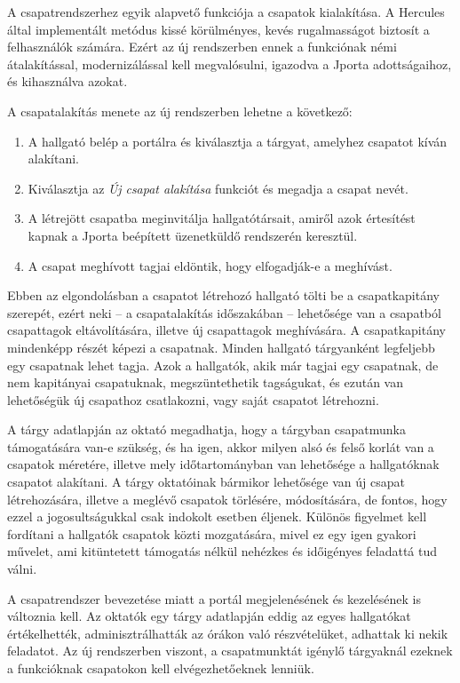 A csapatrendszerhez egyik alapvető funkciója a csapatok kialakítása.
A Hercules által implementált metódus kissé körülményes, kevés rugalmasságot biztosít a felhasználók számára.
Ezért az új rendszerben ennek a funkciónak némi átalakítással, modernizálással kell megvalósulni, igazodva a Jporta adottságaihoz, és kihasználva azokat.

A csapatalakítás menete az új rendszerben lehetne a következő:
\begin{enumerate}
    \item A hallgató belép a portálra és kiválasztja a tárgyat, amelyhez csapatot kíván alakítani.
    \item Kiválasztja az \textit{Új csapat alakítása} funkciót és megadja a csapat nevét.
    \item A létrejött csapatba meginvitálja hallgatótársait, amiről azok értesítést kapnak a Jporta beépített üzenetküldő rendszerén keresztül.
    \item A csapat meghívott tagjai eldöntik, hogy elfogadják-e a meghívást.
\end{enumerate}
Ebben az elgondolásban a csapatot létrehozó hallgató tölti be a csapatkapitány szerepét, ezért neki -- a csapatalakítás időszakában -- lehetősége van a csapatból csapattagok eltávolítására, illetve új csapattagok meghívására.
A csapatkapitány mindenképp részét képezi a csapatnak.
Minden hallgató tárgyanként legfeljebb egy csapatnak lehet tagja.
Azok a hallgatók, akik már tagjai egy csapatnak, de nem kapitányai csapatuknak, megszüntethetik tagságukat, és ezután van lehetőségük új csapathoz csatlakozni, vagy saját csapatot létrehozni.

A tárgy adatlapján az oktató megadhatja, hogy a tárgyban csapatmunka támogatására van-e szükség, és ha igen, akkor milyen alsó és felső korlát van a csapatok méretére, illetve mely időtartományban van lehetősége a hallgatóknak csapatot alakítani.
A tárgy oktatóinak bármikor lehetősége van új csapat létrehozására, illetve a meglévő csapatok törlésére, módosítására, de fontos, hogy ezzel a jogosultságukkal csak indokolt esetben éljenek.
Különös figyelmet kell fordítani a hallgatók csapatok közti mozgatására, mivel ez egy igen gyakori művelet, ami kitüntetett támogatás nélkül nehézkes és időigényes feladattá tud válni.

A csapatrendszer bevezetése miatt a portál megjelenésének és kezelésének is változnia kell.
Az oktatók egy tárgy adatlapján eddig az egyes hallgatókat értékelhették, adminisztrálhatták az órákon való részvételüket, adhattak ki nekik feladatot.
Az új rendszerben viszont, a csapatmunktát igénylő tárgyaknál ezeknek a funkcióknak csapatokon kell elvégezhetőeknek lenniük.

